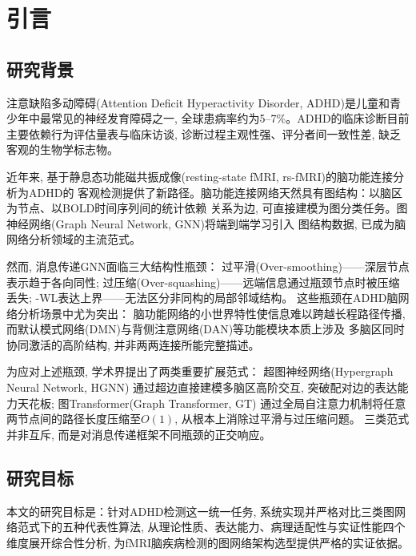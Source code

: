 \documentclass[12pt,a4paper,heading=true,fontset=windows]{ctexart}
\newcommand{\kw}[1]{{\heiti #1}}
\begin{document}
\newpage
\tableofcontents
\newpage

\section{引言}

\subsection{研究背景}

注意缺陷多动障碍(Attention Deficit Hyperactivity Disorder, ADHD)是儿童和青少年中最常见的神经发育障碍之一,
全球患病率约为5--7\%\cite{booth2021}。ADHD的临床诊断目前主要依赖行为评估量表与临床访谈,
诊断过程主观性强、评分者间一致性差, 缺乏客观的生物学标志物。

近年来, 基于静息态功能磁共振成像(resting-state fMRI, rs-fMRI)的脑功能连接分析为ADHD的
客观检测提供了新路径。脑功能连接网络天然具有图结构：以脑区为节点、以BOLD时间序列间的统计依赖
关系为边, 可直接建模为图分类任务。图神经网络(Graph Neural Network, GNN)将端到端学习引入
图结构数据, 已成为脑网络分析领域的主流范式\cite{cui2023brainGB, jiang2025survey}。

然而, 消息传递GNN面临三大结构性瓶颈\cite{xu2019powerful, alon2021bottleneck}：
\kw{过平滑}(Over-smoothing)——深层节点表示趋于各向同性;
\kw{过压缩}(Over-squashing)——远端信息通过瓶颈节点时被压缩丢失;
\kw{1-WL表达上界}——无法区分非同构的局部邻域结构。
这些瓶颈在ADHD脑网络分析场景中尤为突出：
脑功能网络的小世界特性使信息难以跨越长程路径传播,
而默认模式网络(DMN)与背侧注意网络(DAN)等功能模块本质上涉及
\kw{多脑区同时协同激活的高阶结构}, 并非两两连接所能完整描述\cite{ji2022fchat}。

为应对上述瓶颈, 学术界提出了两类重要扩展范式：
超图神经网络(Hypergraph Neural Network, HGNN)\cite{feng2019hgnn}
通过超边直接建模多脑区高阶交互, 突破配对边的表达能力天花板;
图Transformer(Graph Transformer, GT)\cite{dwivedi2021graph}
通过全局自注意力机制将任意两节点间的路径长度压缩至$O(1)$,
从根本上消除过平滑与过压缩问题。
三类范式并非互斥, 而是对消息传递框架不同瓶颈的正交响应\cite{rampasek2022recipe}。

\subsection{研究目标}

本文的研究目标是：针对ADHD检测这一统一任务,
系统实现并严格对比三类图网络范式下的五种代表性算法,
从\kw{理论性质、表达能力、病理适配性与实证性能}四个维度展开综合性分析,
为fMRI脑疾病检测的图网络架构选型提供严格的实证依据。
\end{document}
